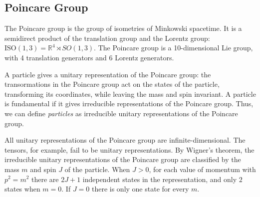 \subsection{Poincare Group}

The Poincare group is the group of isometries of Minkowski spacetime. It is a semidirect product of the translation group and the Lorentz group: $\text{ISO}(1,3) = \mathbb{R}^4 \rtimes SO(1,3)$. The Poincare group is a 10-dimensional Lie group, with 4 translation generators and 6 Lorentz generators.

A particle gives a unitary representation of the Poincare group: the transormations in the Poincare group act on the states of the particle, transforming its coordinates, while leaving the mass and spin invariant. A particle is fundamental if it gives irreducible representations of the Poincare group. Thus, we can define \textit{particles} as irreducible unitary representations of the Poincare group.

All unitary representations of the Poincare group are infinite-dimensional. The tensors, for example, fail to be unitary representations.  By Wigner's theorem, the irreducible unitary representations of the Poincare group are classified by the mass $m$ and spin $J$ of the particle. When $J > 0$, for each value of momentum with $p^2 = m^2$ there are $2 J + 1$ independent states in the representation, and only $2$ states when $m = 0$. If $J = 0$ there is only one state for every $m$.

